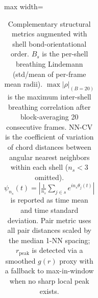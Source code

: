 \begin{table}[t]
\begin{adjustbox}{max width=\textwidth}
\begin{tabular}{rrrlllrllll}
\bottomrule
\end{tabular}
\end{adjustbox}
\caption{Complementary structural metrics augmented with shell bond-orientational order. $B_s$ is the per-shell breathing Lindemann (std/mean of per-frame mean radii). $\max|\rho|_{(B=20)}$ is the maximum inter-shell breathing correlation after block-averaging 20 consecutive frames. NN-CV is the coefficient of variation of chord distances between angular nearest neighbors within each shell ($n_s<3$ omitted). $\psi_{n_s}(t)=\left|\frac{1}{n_s}\sum_{j\in s} e^{i n_s\theta_j(t)}\right|$ is reported as time mean and time standard deviation. Pair metric uses all pair distances scaled by the median 1-NN spacing; $r_{\mathrm{peak}}$ is detected via a smoothed $g(r)$ proxy with a fallback to max-in-window when no sharp local peak exists.}
\label{tab:shell_complement_plus}
\end{table}
